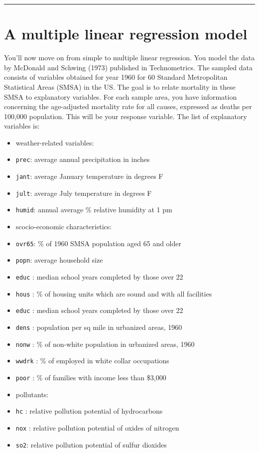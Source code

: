 \documentclass[
]{book}
\providecommand{\tightlist}{%
  \setlength{\itemsep}{0pt}\setlength{\parskip}{0pt}}
\begin{document}
\begin{center}\rule{0.5\linewidth}{0.5pt}\end{center}

\hypertarget{a-multiple-linear-regression-model}{%
\section{A multiple linear regression model}\label{a-multiple-linear-regression-model}}

You'll now move on from simple to multiple linear regression. You model the
data by McDonald and Schwing (1973) published in Technometrics. The sampled data consists of variables obtained for year 1960 for 60 Standard Metropolitan
Statistical Areas (SMSA) in the US. The goal is to relate mortality in these SMSA to explanatory variables. For each sample area, you have information concerning the age-adjusted mortality rate for all causes, expressed as deaths per 100,000 population. This will be your response variable. The list of explanatory variables is:

\begin{itemize}
\tightlist
\item
  weather-related variables:
\item
  \texttt{prec}: average annual precipitation in inches
\item
  \texttt{jant}: average January temperature in degrees F
\item
  \texttt{jult}: average July temperature in degrees F
\item
  \texttt{humid}: annual average \% relative humidity at 1 pm
\item
  scocio-economic characteristics:
\item
  \texttt{ovr65}: \% of 1960 SMSA population aged 65 and older
\item
  \texttt{popn}: average household size
\item
  \texttt{educ} : median school years completed by those over 22
\item
  \texttt{hous} : \% of housing units which are sound and with all facilities
\item
  \texttt{educ} : median school years completed by those over 22
\item
  \texttt{dens} : population per sq mile in urbanized areas, 1960
\item
  \texttt{nonw} : \% of non-white population in urbanized areas, 1960
\item
  \texttt{wwdrk} : \% of employed in white collar occupations
\item
  \texttt{poor} : \% of families with income less than \$3,000
\item
  pollutants:
\item
  \texttt{hc} : relative pollution potential of hydrocarbons
\item
  \texttt{nox} : relative pollution potential of oxides of nitrogen
\item
  \texttt{so2}: relative pollution potential of sulfur dioxides
\end{itemize}
\end{document}
